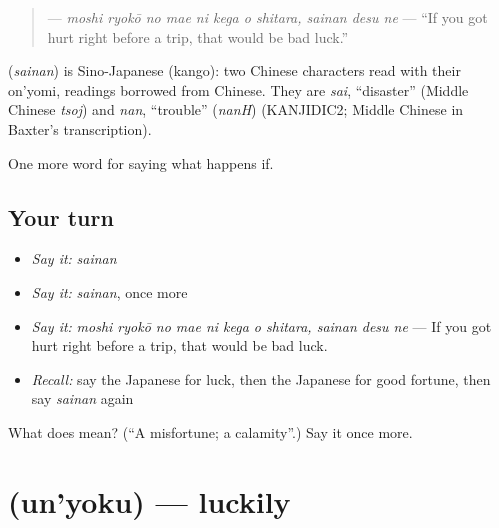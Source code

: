 \begin{quote}
\textbf{    } — \emph{moshi ryokō no mae ni kega o shitara, sainan desu ne} — \textquotedblleft{}If you got hurt right before a trip, that would be bad luck.\textquotedblright{}
\end{quote}

\begin{cousinweb}
\textbf{} (\emph{sainan}) is Sino-Japanese (kango): two Chinese characters read with their on'yomi, readings borrowed from Chinese. They are \emph{sai}, \textquotedblleft{}disaster\textquotedblright{} (Middle Chinese \emph{tsoj}) and \emph{nan}, \textquotedblleft{}trouble\textquotedblright{} (\emph{nanH}) (KANJIDIC2; Middle Chinese in Baxter's transcription).
\end{cousinweb}

\begin{grammarlens}[title={What you've built}]
One more word for saying what happens if.
\end{grammarlens}

\subsection*{Your turn}
\begin{itemize}
\raggedright
  \item \emph{Say it:} \emph{sainan}
  \item \emph{Say it:} \emph{sainan}, once more
  \item \emph{Say it:} \emph{moshi ryokō no mae ni kega o shitara, sainan desu ne} — If you got hurt right before a trip, that would be bad luck.
  \item \emph{Recall:} say the Japanese for luck, then the Japanese for good fortune, then say \emph{sainan} again
\end{itemize}

\begin{tcolorbox}[breakable,colback=teal!4,colframe=teal!35!black,title={Before you move on}]
What does  mean? (\textquotedblleft{}A misfortune; a calamity\textquotedblright{}.) Say it once more.
\end{tcolorbox}
\section[\texorpdfstring{\ja{うんよく} (un'yoku)}{うんよく (un'yoku)}]{ (un'yoku) — luckily}

